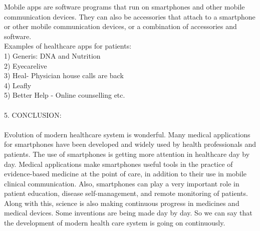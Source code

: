 \documentclass{article}
\begin{document}
Mobile apps are software programs that run on smartphones and other mobile communication devices. They can also be accessories that attach to a smartphone or other mobile communication devices, or a combination of accessories and software.\\
Examples of healthcare apps for patients:\\
1) Generis: DNA and Nutrition\\
 2) Eyecarelive\\
 3) Heal- Physician house calls are back\\
 4) Leafly\\
 5) Better Help - Online counselling etc.\\ 
\\
5. CONCLUSION:\\ 
\\
Evolution of modern healthcare system is wonderful. Many medical applications for smartphones have been developed and widely used by health professionals and patients. The use of smartphones is getting more attention in healthcare day by day. Medical applications make smartphones useful tools in the practice of evidence-based medicine at the point of care, in addition to their use in mobile clinical communication. Also, smartphones can play a very important role in patient education, disease self-management, and remote monitoring of patients. Along with this, science is also making continuous progress in medicines and medical devices.  Some inventions are being made day by day. So we can say that the development of modern health care system is going on continuously.

%
%
\end{document}
